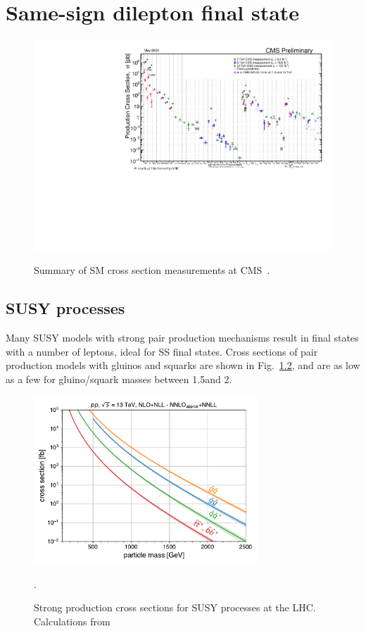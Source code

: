 \chapter{Same-sign dilepton final state}

\begin{figure}[!hbtp]
\centering
\includegraphics[width=.95\textwidth]{figs/misc/sm_xsecs.pdf} \\
\caption{Summary of SM cross section measurements at CMS~\cite{CMS:SMxsecs}.}
\label{fig:SMxsecs}
\end{figure}

\FloatBarrier

\section{SUSY processes}


Many SUSY models with strong pair production mechanisms result in
final states with a number of leptons, ideal for SS final states.
Cross sections of pair production models with gluinos and squarks 
are shown in Fig.~\ref{fig:susy_xsecs}, and are as low as a few \fbinv 
for gluino/squark masses between 1.5\TeV and 2\TeV.

\begin{figure}[htb!]
    \centering
    \includegraphics[width=0.75\textwidth]{figs/ssan/plot_susy_xsecs}
\caption{Strong production cross sections for SUSY processes at the LHC. Calculations from \cite{THEORY:SUSYxsecs}}.
\label{fig:susy_xsecs}
\end{figure}

